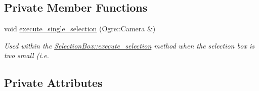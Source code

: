 \subsection*{Private Member Functions}
\begin{DoxyCompactItemize}
\item 
void \hyperlink{class_selection_box_a46bb8a54b0f9549ce74985f528ff7c81}{execute\+\_\+single\+\_\+selection} (Ogre\+::\+Camera \&)
\begin{DoxyCompactList}\small\item\em Used within the \hyperlink{class_selection_box_a8013255ab23d92e60bb28378e837421a}{Selection\+Box\+::execute\+\_\+selection} method when the selection box is two small (i.\+e. \end{DoxyCompactList}\end{DoxyCompactItemize}
\subsection*{Private Attributes}
